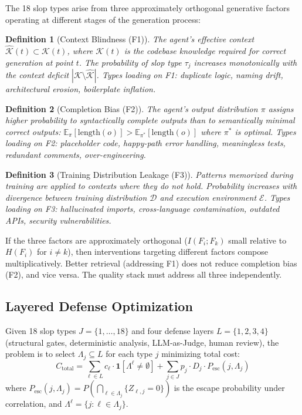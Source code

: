 \documentclass[11pt, a4paper]{googledeepmind}
\newtheorem{definition}{Definition}[section]
\begin{document}
The 18 slop types arise from three approximately orthogonal generative factors operating at different stages of the generation process:

\begin{definition}[Context Blindness (F1)]
The agent's effective context $\hat{\mathcal{K}}(t) \subset \mathcal{K}(t)$, where $\mathcal{K}(t)$ is the codebase knowledge required for correct generation at point $t$. The probability of slop type $\tau_j$ increases monotonically with the context deficit $|\mathcal{K} \setminus \hat{\mathcal{K}}|$. Types loading on F1: duplicate logic, naming drift, architectural erosion, boilerplate inflation.
\end{definition}

\begin{definition}[Completion Bias (F2)]
The agent's output distribution $\pi$ assigns higher probability to syntactically complete outputs than to semantically minimal correct outputs: $\mathbb{E}_\pi[\mathrm{length}(o)] > \mathbb{E}_{\pi^*}[\mathrm{length}(o)]$ where $\pi^*$ is optimal. Types loading on F2: placeholder code, happy-path error handling, meaningless tests, redundant comments, over-engineering.
\end{definition}

\begin{definition}[Training Distribution Leakage (F3)]
Patterns memorized during training are applied to contexts where they do not hold. Probability increases with divergence between training distribution $\mathcal{D}$ and execution environment $\mathcal{E}$. Types loading on F3: hallucinated imports, cross-language contamination, outdated APIs, security vulnerabilities.
\end{definition}

If the three factors are approximately orthogonal ($I(F_i; F_k)$ small relative to $H(F_i)$ for $i \neq k$), then interventions targeting different factors compose multiplicatively. Better retrieval (addressing F1) does not reduce completion bias (F2), and vice versa. The quality stack must address all three independently.

\subsection{Layered Defense Optimization}

Given 18 slop types $J = \{1, \ldots, 18\}$ and four defense layers $L = \{1, 2, 3, 4\}$ (structural gates, deterministic analysis, LLM-as-Judge, human review), the problem is to select $\Lambda_j \subseteq L$ for each type $j$ minimizing total cost:
\begin{equation}
C_{\mathrm{total}} = \sum_{\ell \in L} c_\ell \cdot \mathbf{1}[\Lambda^\ell \neq \emptyset] + \sum_{j \in J} p_j \cdot D_j \cdot P_{\mathrm{esc}}(j, \Lambda_j)
\end{equation}
where $P_{\mathrm{esc}}(j, \Lambda_j) = P(\bigcap_{\ell \in \Lambda_j} \{Z_{\ell,j} = 0\})$ is the escape probability under correlation, and $\Lambda^\ell = \{j : \ell \in \Lambda_j\}$.
\end{document}
